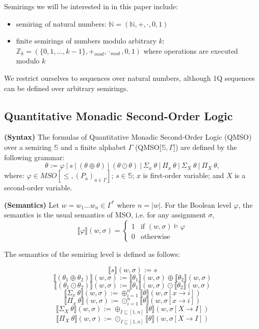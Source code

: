 \documentclass[12pt]{article}
\theoremstyle{definition}
\begin{document}
Semirings we will be interested in in this paper include:

\begin{itemize}
    \item semiring of natural numbers: $\mathbb{N} = (\mathbb{N}, +, \cdot, 0, 1)$
    \item finite semirings of numbers modulo arbitrary $k$: $ \mathbb{Z}_k = (\{0,1,\ldots,k-1\}, +_{mod}, \cdot_{mod}, 0, 1)$ where operations are executed modulo $k$
\end{itemize}

We restrict ourselves to sequences over natural numbers, although 1Q sequences can be defined over arbitrary semirings.

\subsection{Quantitative Monadic Second-Order Logic}

\textbf{(Syntax)} The formulas of Quantitative Monadic Second-Order Logic (QMSO) over a semiring $\mathbb{S}$ and a finite alphabet $\Gamma$ (QMSO[$\mathbb{S}, \Gamma$]) are defined by the following grammar:
$$ \theta := \varphi \ | \ s \ | \ (\theta \oplus \theta) \ | \ (\theta \odot \theta) \ | \ \Sigma_x \ \theta \ | \ \Pi_x \ \theta \ | \ \Sigma_X \ \theta \ | \ \Pi_X \ \theta,$$
where: $\varphi \in MSO[\leq, (P_a)_{a \in \Gamma}]$; $s \in \mathbb{S}$; $x$ is first-order variable; and $X$ is a second-order variable.

\textbf{(Semantics)} Let $w 
= w_1 \dots w_n \in \Gamma^*$ where $n = |w|$. For the Boolean level $\varphi$, the semantics is the usual semantics of MSO, i.e. for any assignment $\sigma$,
\begin{equation*}
    \llbracket\varphi\rrbracket(w, \sigma) =
      \begin{cases}
        1 & \text{if $(w, \sigma) \models \varphi$}\\
        0 & \text{otherwise}
      \end{cases}       
\end{equation*}

The semantics of the semiring level is defined as follows:

$$\llbracket s\rrbracket(w, \sigma) := s$$
$$\llbracket(\theta_1 \oplus \theta_2)\rrbracket(w, \sigma) := \llbracket\theta_1\rrbracket(w, \sigma) \oplus \llbracket\theta_2\rrbracket(w, \sigma)$$
$$\llbracket(\theta_1 \odot \theta_2)\rrbracket(w, \sigma) := \llbracket\theta_1\rrbracket(w, \sigma) \odot \llbracket\theta_2\rrbracket(w, \sigma)$$
$$\llbracket \Sigma_x \ \theta \rrbracket(w, \sigma) := \oplus^n_{i=1}\llbracket \theta \rrbracket (w, \sigma[x \rightarrow i])$$
$$\llbracket \Pi_x \ \theta \rrbracket(w, \sigma) := \odot^n_{i=1}\llbracket \theta \rrbracket (w, \sigma[x \rightarrow i])$$
$$\llbracket \Sigma_X \ \theta \rrbracket(w, \sigma) := \oplus_{I \subseteq [1,n]}\llbracket \theta \rrbracket (w, \sigma[X \rightarrow I])$$
$$\llbracket \Pi_X \ \theta \rrbracket(w, \sigma) := \odot_{I \subseteq [1,n]}\llbracket \theta \rrbracket (w, \sigma[X \rightarrow I])$$
\end{document}
